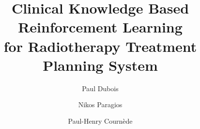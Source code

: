 \documentclass[11pt,twocolumn,twoside]{article}
\begin{document}
\title{Clinical Knowledge Based Reinforcement Learning\\for Radiotherapy Treatment Planning System}

\author[1,2,3]{Paul Dubois}
\author[1]{Nikos Paragios}
\author[2]{Paul-Henry Cournède}




\maketitle
\thispagestyle{fancy}





\begin{customabstract}
	
\end{customabstract}







 
\end{document}
